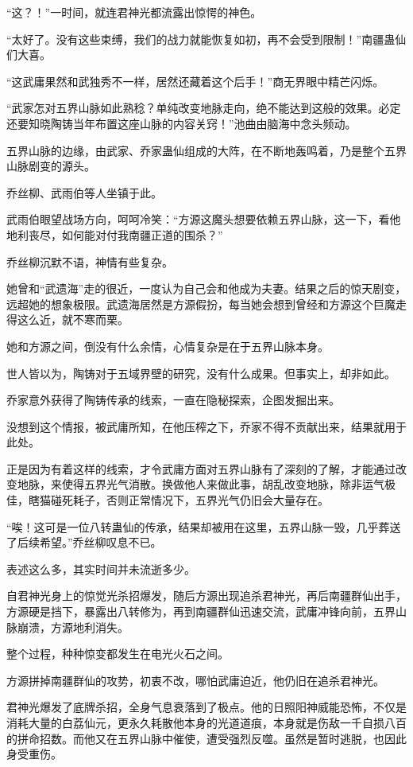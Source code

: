 \begin{this_body}
“这？！”一时间，就连君神光都流露出惊愕的神色。

“太好了。没有这些束缚，我们的战力就能恢复如初，再不会受到限制！”南疆蛊仙们大喜。

“这武庸果然和武独秀不一样，居然还藏着这个后手！”商无界眼中精芒闪烁。

“武家怎对五界山脉如此熟稔？单纯改变地脉走向，绝不能达到这般的效果。必定还要知晓陶铸当年布置这座山脉的内容关窍！”池曲由脑海中念头频动。

五界山脉的边缘，由武家、乔家蛊仙组成的大阵，在不断地轰鸣着，乃是整个五界山脉剧变的源头。

乔丝柳、武雨伯等人坐镇于此。

武雨伯眼望战场方向，呵呵冷笑：“方源这魔头想要依赖五界山脉，这一下，看他地利丧尽，如何能对付我南疆正道的围杀？”

乔丝柳沉默不语，神情有些复杂。

她曾和“武遗海”走的很近，一度认为自己会和他成为夫妻。结果之后的惊天剧变，远超她的想象极限。武遗海居然是方源假扮，每当她会想到曾经和方源这个巨魔走得这么近，就不寒而栗。

她和方源之间，倒没有什么余情，心情复杂是在于五界山脉本身。

世人皆以为，陶铸对于五域界壁的研究，没有什么成果。但事实上，却非如此。

乔家意外获得了陶铸传承的线索，一直在隐秘探索，企图发掘出来。

没想到这个情报，被武庸所知，在他压榨之下，乔家不得不贡献出来，结果就用于此处。

正是因为有着这样的线索，才令武庸方面对五界山脉有了深刻的了解，才能通过改变地脉，来使得五界光气消散。换做他人来做此事，胡乱改变地脉，除非运气极佳，瞎猫碰死耗子，否则正常情况下，五界光气仍旧会大量存在。

“唉！这可是一位八转蛊仙的传承，结果却被用在这里，五界山脉一毁，几乎葬送了后续希望。”乔丝柳叹息不已。

表述这么多，其实时间并未流逝多少。

自君神光身上的惊觉光杀招爆发，随后方源出现追杀君神光，再后南疆群仙出手，方源硬是挡下，暴露出八转修为，再到南疆群仙迅速交流，武庸冲锋向前，五界山脉崩溃，方源地利消失。

整个过程，种种惊变都发生在电光火石之间。

方源拼掉南疆群仙的攻势，初衷不改，哪怕武庸迫近，他仍旧在追杀君神光。

君神光爆发了底牌杀招，全身气息衰落到了极点。他的日照阳神威能恐怖，不仅是消耗大量的白荔仙元，更永久耗散他本身的光道道痕，本身就是伤敌一千自损八百的拼命招数。而他又在五界山脉中催使，遭受强烈反噬。虽然是暂时逃脱，也因此身受重伤。


\end{this_body}
